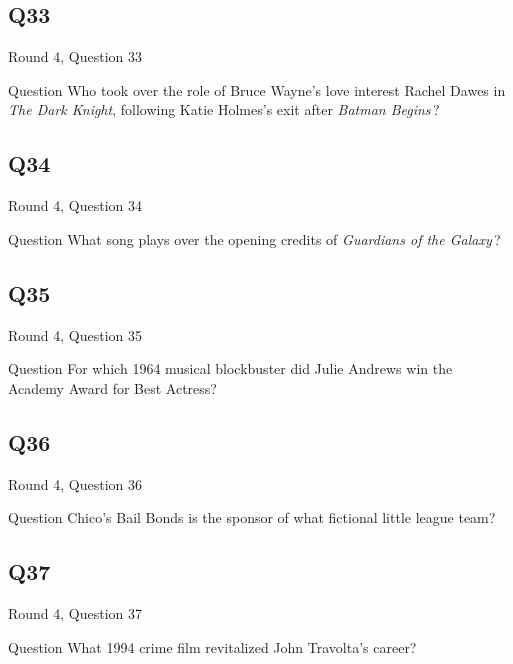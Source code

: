 \documentclass[11pt]{beamer}
\begin{document}
\subsection*{Q33}
\begin{frame}[t]{Round 4, Question 33}
\vspace{2em}
\begin{block}{Question}
Who took over the role of Bruce Wayne's love interest Rachel Dawes in \emph{The Dark Knight}, following Katie Holmes's exit after \emph{Batman Begins}\,?
\end{block}
\end{frame}
    

\subsection*{Q34}
\begin{frame}[t]{Round 4, Question 34}
\vspace{2em}
\begin{block}{Question}
What song plays over the opening credits of \emph{Guardians of the Galaxy}\,?
\end{block}
\end{frame}
    

\subsection*{Q35}
\begin{frame}[t]{Round 4, Question 35}
\vspace{2em}
\begin{block}{Question}
For which 1964 musical blockbuster did Julie Andrews win the Academy Award for Best Actress?
\end{block}
\end{frame}
    

\subsection*{Q36}
\begin{frame}[t]{Round 4, Question 36}
\vspace{2em}
\begin{block}{Question}
Chico's Bail Bonds is the sponsor of what fictional little league team?
\end{block}
\end{frame}
    

\subsection*{Q37}
\begin{frame}[t]{Round 4, Question 37}
\vspace{2em}
\begin{block}{Question}
What 1994 crime film revitalized John Travolta's career?
\end{block}
\end{frame}
    
\end{document}
